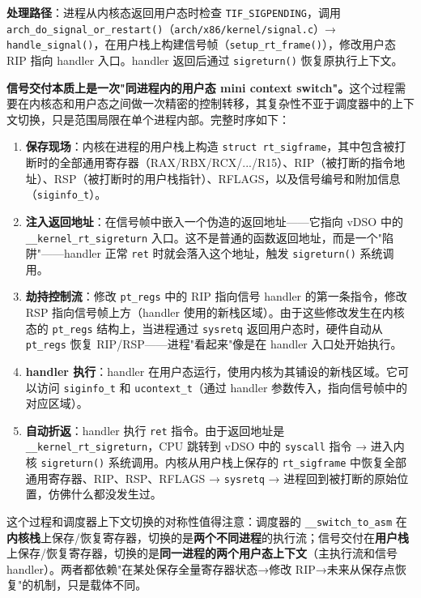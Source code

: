 \documentclass[a4paper]{article}
\begin{document}
\textbf{处理路径}：进程从内核态返回用户态时检查 \texttt{TIF\_SIGPENDING}，调用 \texttt{arch\_do\_signal\_or\_restart()}（\texttt{arch/x86/kernel/signal.c}）→ \texttt{handle\_signal()}，在用户栈上构建信号帧（\texttt{setup\_rt\_frame()}），修改用户态 RIP 指向 handler 入口。handler 返回后通过 \texttt{sigreturn()} 恢复原执行上下文。

\textbf{信号交付本质上是一次"同进程内的用户态 mini context switch"。}这个过程需要在内核态和用户态之间做一次精密的控制转移，其复杂性不亚于调度器中的上下文切换，只是范围局限在单个进程内部。完整时序如下：

\begin{enumerate}[leftmargin=*]
    \item \textbf{保存现场}：内核在进程的用户栈上构造 \texttt{struct rt\_sigframe}，其中包含被打断时的全部通用寄存器（RAX/RBX/RCX/.../R15）、RIP（被打断的指令地址）、RSP（被打断时的用户栈指针）、RFLAGS，以及信号编号和附加信息（\texttt{siginfo\_t}）。
    \item \textbf{注入返回地址}：在信号帧中嵌入一个伪造的返回地址——它指向 vDSO 中的 \texttt{\_\_kernel\_rt\_sigreturn} 入口。这不是普通的函数返回地址，而是一个"陷阱"——handler 正常 \texttt{ret} 时就会落入这个地址，触发 \texttt{sigreturn()} 系统调用。
    \item \textbf{劫持控制流}：修改 \texttt{pt\_regs} 中的 RIP 指向信号 handler 的第一条指令，修改 RSP 指向信号帧上方（handler 使用的新栈区域）。由于这些修改发生在内核态的 \texttt{pt\_regs} 结构上，当进程通过 \texttt{sysretq} 返回用户态时，硬件自动从 \texttt{pt\_regs} 恢复 RIP/RSP——进程"看起来"像是在 handler 入口处开始执行。
    \item \textbf{handler 执行}：handler 在用户态运行，使用内核为其铺设的新栈区域。它可以访问 \texttt{siginfo\_t} 和 \texttt{ucontext\_t}（通过 handler 参数传入，指向信号帧中的对应区域）。
    \item \textbf{自动折返}：handler 执行 \texttt{ret} 指令。由于返回地址是 \texttt{\_\_kernel\_rt\_sigreturn}，CPU 跳转到 vDSO 中的 \texttt{syscall} 指令 → 进入内核 \texttt{sigreturn()} 系统调用。内核从用户栈上保存的 \texttt{rt\_sigframe} 中恢复全部通用寄存器、RIP、RSP、RFLAGS → \texttt{sysretq} → 进程回到被打断的原始位置，仿佛什么都没发生过。
\end{enumerate}

这个过程和调度器上下文切换的对称性值得注意：调度器的 \texttt{\_\_switch\_to\_asm} 在\textbf{内核栈}上保存/恢复寄存器，切换的是\textbf{两个不同进程}的执行流；信号交付在\textbf{用户栈}上保存/恢复寄存器，切换的是\textbf{同一进程的两个用户态上下文}（主执行流和信号 handler）。两者都依赖"在某处保存全量寄存器状态→修改 RIP→未来从保存点恢复"的机制，只是载体不同。
\end{document}

